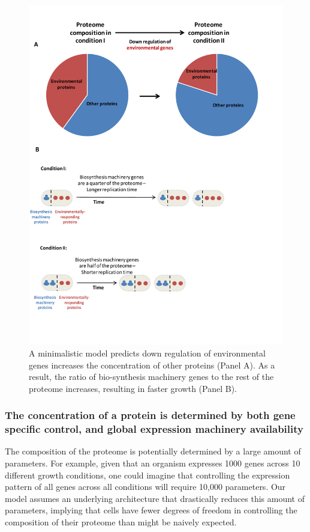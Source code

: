 \documentclass[a4paper]{article}
\begin{document}
\begin{figure}[H]
\begin{center}
\includegraphics[width=0.84\columnwidth]{Figures7-trieste.pdf}
\caption{\label{fig:model}
  A minimalistic model predicts down regulation of environmental genes increases the concentration of other proteins (Panel A).
As a result, the ratio of bio-synthesis machinery genes to the rest of the proteome increases, resulting in faster growth (Panel B).
}
\end{center}
\end{figure}

\subsubsection{The concentration of a protein is determined by both gene specific control, and global
expression machinery availability}
The composition of the proteome is potentially determined by a large amount of parameters.
For example, given that an organism expresses 1000 genes across 10 different growth conditions, one could imagine that controlling the expression pattern of all genes across all conditions will require 10,000 parameters.
Our model assumes an underlying architecture that drastically reduces this amount of parameters, implying that cells have fewer degrees of freedom in controlling the composition of their proteome than might be naively expected.
\end{document}

